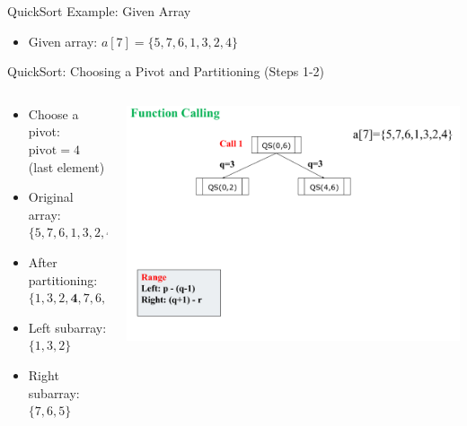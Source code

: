 \begin{frame}{QuickSort Example: Given Array}
  \begin{itemize}
    \item Given array: $a[7] = \{5, 7, 6, 1, 3, 2, 4\}$
  \end{itemize}
\end{frame}

\begin{frame}{QuickSort: Choosing a Pivot and Partitioning (Steps 1-2)}
  \begin{columns}
    \begin{column}{0.4\textwidth}
      \begin{itemize}
        \item Choose a pivot: $\text{pivot} = 4$ (last element)
        \item Original array: $\{5, 7, 6, 1, 3, 2, 4\}$
        \item After partitioning: $\{1,3,2, \textbf{4}, 7,6,5\}$
        \item Left subarray: $\{1,3,2\}$ \item Right subarray: $\{7,6,5\}$
      \end{itemize}
    \end{column}
    \begin{column}{0.6\textwidth}
      \includegraphics[width=1\textwidth]{assets/Qu1.png}
    \end{column}
  \end{columns}
\end{frame}

